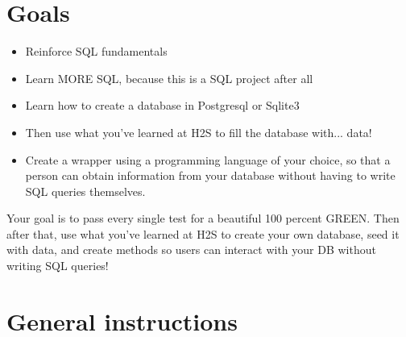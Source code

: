 \documentclass{42-en}
\begin{document}
\chapter{Goals}

	\begin{itemize}\itemsep1pt 
		\item Reinforce SQL fundamentals
		\item Learn MORE SQL, because this is a SQL project after all
		\item Learn how to create a database in Postgresql or Sqlite3
		\item Then use what you've learned at H2S to fill the database with... data!  
		\item Create a wrapper using a programming language of your choice, so 
			that a person can obtain information from your database without 
			having to write SQL queries themselves.
	\end{itemize}

	Your goal is to pass every single test for a beautiful 100 percent GREEN. Then 
	after that, use what you've learned at H2S to create your own database, seed it 
	with data, and create methods so users can interact with your DB without writing SQL queries! 

\chapter{General instructions}
\end{document}
